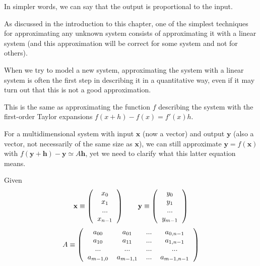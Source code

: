 \documentclass[justified,sixbynine]{tufte-book}
\theoremstyle{plain}%
\theoremstyle{definition}
\theoremstyle{remark}
\begin{document}
\begin{fullwidth}
In simpler words, we can say that the output is proportional to the input.

As discussed in the introduction to this chapter, one of the simplest techniques for approximating any unknown system consists of approximating it with a linear system (and this approximation will be correct for some system and not for others).

When we try to model a new system, approximating the system with a linear system is often the first step in describing it in a quantitative way, even if it may turn out that this is not a good approximation.

This is the same as approximating the function $f$ describing the system with the first-order Taylor expansions $f(x+h) - f(x) = f'(x) h$.

For a multidimensional system with input $\mathbf{x}$ (now a vector) and output $\mathbf{y}$ (also a vector, not necessarily of the same size as $\mathbf{x}$), we can still approximate $\mathbf{y}=f(\mathbf{x})$ with
$f(\mathbf{y}+\mathbf{h}) - \mathbf{y} \simeq A \mathbf{h}$, yet we need to clarify what this latter equation means.

Given
\begin{equation}
\mathbf{x} \equiv \left(\begin{tabular}{c}$x_0$\\$x_1$\\...\\$x_{n-1}$\end{tabular}\right)\qquad
\mathbf{y} \equiv \left(\begin{tabular}{c}$y_0$\\$y_1$\\...\\$y_{m-1}$\end{tabular}\right)
\end{equation}
\begin{equation}
A \equiv \left(\begin{tabular}{cccc}
$a_{00}$ & $a_{01}$ & ... & $a_{0,n-1}$ \\
$a_{10}$ & $a_{11}$ & ... & $a_{1,n-1}$ \\
... & ... & ... & ... \\
$a_{m-1,0}$ & $a_{m-1,1}$ & ... & $a_{m-1,n-1}$
\end{tabular}\right)
\end{equation}


\end{fullwidth}
\end{document}
